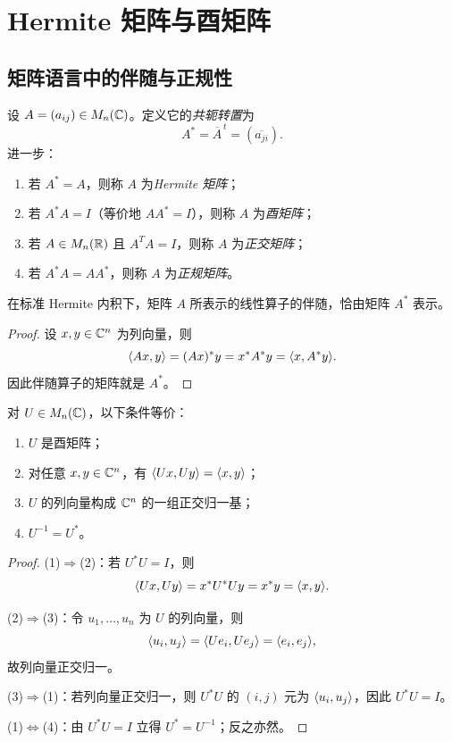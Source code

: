 \section{Hermite 矩阵与酉矩阵}

\subsection{矩阵语言中的伴随与正规性}

\begin{definition}
设 $A=(a_{ij})\in M_n(\mathbb{C})$。定义它的\emph{共轭转置}为
\[
A^*=\overline{A}^{\,t}=(\overline{a_{ji}}).
\]
进一步：
\begin{enumerate}[label=\textnormal{(\arabic*)}]
  \item 若 $A^*=A$，则称 $A$ 为\emph{Hermite 矩阵}；
  \item 若 $A^*A=I$（等价地 $AA^*=I$），则称 $A$ 为\emph{酉矩阵}；
  \item 若 $A\in M_n(\mathbb{R})$ 且 $A^TA=I$，则称 $A$ 为\emph{正交矩阵}；
  \item 若 $A^*A=AA^*$，则称 $A$ 为\emph{正规矩阵}。
\end{enumerate}
\end{definition}

\begin{proposition}
在标准 Hermite 内积下，矩阵 $A$ 所表示的线性算子的伴随，恰由矩阵 $A^*$ 表示。
\end{proposition}

\begin{proof}
设 $x,y\in\mathbb{C}^n$ 为列向量，则
\[
\langle Ax, y \rangle=(Ax)^*y=x^*A^*y=\langle x, A^*y \rangle.
\]
因此伴随算子的矩阵就是 $A^*$。
\end{proof}

\begin{proposition}
对 $U\in M_n(\mathbb{C})$，以下条件等价：
\begin{enumerate}[label=\textnormal{(\arabic*)}]
  \item $U$ 是酉矩阵；
  \item 对任意 $x,y\in\mathbb{C}^n$，有 $\langle Ux, Uy \rangle=\langle x, y \rangle$；
  \item $U$ 的列向量构成 $\mathbb{C}^n$ 的一组正交归一基；
  \item $U^{-1}=U^*$。
\end{enumerate}
\end{proposition}

\begin{proof}
(1)$\Rightarrow$(2)：若 $U^*U=I$，则
\[
\langle Ux, Uy \rangle=x^*U^*Uy=x^*y=\langle x, y \rangle.
\]

(2)$\Rightarrow$(3)：令 $u_1,\dots,u_n$ 为 $U$ 的列向量，则
\[
\langle u_i, u_j \rangle=\langle Ue_i, Ue_j \rangle=\langle e_i, e_j \rangle,
\]
故列向量正交归一。

(3)$\Rightarrow$(1)：若列向量正交归一，则 $U^*U$ 的 $(i,j)$ 元为 $\langle u_i, u_j \rangle$，因此 $U^*U=I$。

(1)$\Leftrightarrow$(4)：由 $U^*U=I$ 立得 $U^*=U^{-1}$；反之亦然。
\end{proof}

